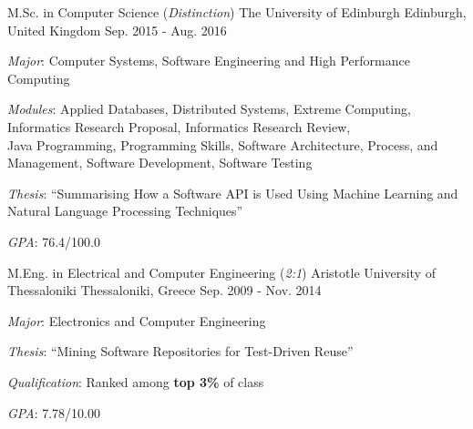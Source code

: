 

\begin{cventries}

  \cventry
    {M.Sc. in Computer Science (\textit{Distinction})} %
    {The University of Edinburgh} %
    {Edinburgh, United Kingdom} %
    {Sep. 2015 - Aug. 2016} %
    {
      \begin{cvitems} %
      	\item {\textit{Major}: Computer Systems, Software Engineering and High Performance Computing}
        \item {\textit{Modules}: Applied Databases, Distributed Systems, Extreme Computing, Informatics Research Proposal, Informatics Research Review,\\Java Programming, Programming Skills, Software Architecture, Process, and Management, Software Development, Software Testing}
        \item {\textit{Thesis}: ``Summarising How a Software API is Used Using Machine Learning and Natural Language Processing Techniques''}
        \item{\textit{GPA}: 76.4/100.0}
      \end{cvitems}
    }
    
    \cventry
    {M.Eng. in Electrical and Computer Engineering (\textit{2:1})} %
    {Aristotle University of Thessaloniki} %
    {Thessaloniki, Greece} %
    {Sep. 2009 - Nov. 2014} %
    {
      \begin{cvitems} %
      	\item {\textit{Major}: Electronics and Computer Engineering}
        \item {\textit{Thesis}: ``Mining Software Repositories for Test-Driven Reuse''}
        \item {\textit{Qualification}: Ranked among \textbf{top 3\%} of class}
		\item{\textit{GPA}: 7.78/10.00}      
      \end{cvitems}
    }

\end{cventries}
